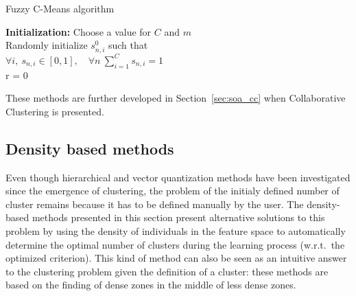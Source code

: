     \begin{algorithm}
        \caption{Fuzzy C-Means algorithm}
\label{alg:fcm}
    \textbf{Initialization:} Choose a value for $C$ and $m$\\
    Randomly initialize $s^0_{n,i}$ such that\\
    $\forall i, ~ s_{n,i} \in [0,1], \quad \forall n ~ \sum\limits_{i=1}^C s_{n,i} = 1$\\
    r = 0
\end{algorithm}

These methods are further developed in Section~\ref{sec:soa_cc} when Collaborative Clustering is presented.

\subsection{Density based methods}

Even though hierarchical and vector quantization methods have been investigated since the emergence of clustering, the problem of the initialy defined number of cluster remains because it has to be defined manually by the user. The density-based methods presented in this section present alternative solutions to this problem by using the density of individuals in the feature space to automatically determine the optimal number of clusters during the learning process (w.r.t.\ the optimized criterion). This kind of method can also be seen as an intuitive answer to the clustering problem given the definition of a cluster: these methods are based on the finding of dense zones in the middle of less dense zones.

